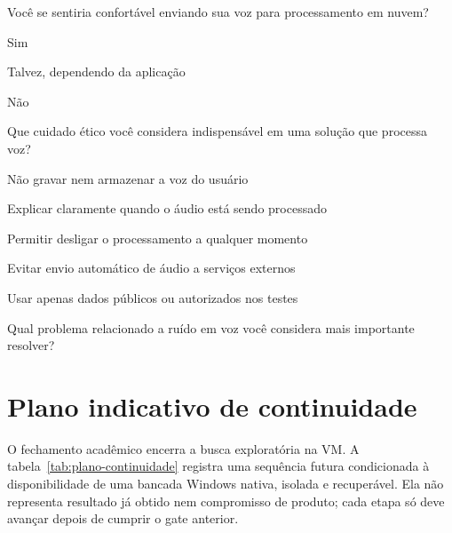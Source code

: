 
\begin{perguntaFormulario}{Você se sentiria confortável enviando sua voz para processamento em nuvem?}
\begin{opcoesFormulario}
    \item Sim
    \item Talvez, dependendo da aplicação
    \item Não
\end{opcoesFormulario}
\end{perguntaFormulario}

\begin{perguntaFormulario}{Que cuidado ético você considera indispensável em uma solução que processa voz?}
\begin{opcoesFormulario}
    \item Não gravar nem armazenar a voz do usuário
    \item Explicar claramente quando o áudio está sendo processado
    \item Permitir desligar o processamento a qualquer momento
    \item Evitar envio automático de áudio a serviços externos
    \item Usar apenas dados públicos ou autorizados nos testes
\end{opcoesFormulario}
\end{perguntaFormulario}

\begin{perguntaFormulario}{Qual problema relacionado a ruído em voz você considera mais importante resolver?}
\end{perguntaFormulario}

\section{Plano indicativo de continuidade}

O fechamento acadêmico encerra a busca exploratória na VM. A tabela~\ref{tab:plano-continuidade} registra uma sequência futura condicionada à disponibilidade de uma bancada Windows nativa, isolada e recuperável. Ela não representa resultado já obtido nem compromisso de produto; cada etapa só deve avançar depois de cumprir o gate anterior.

